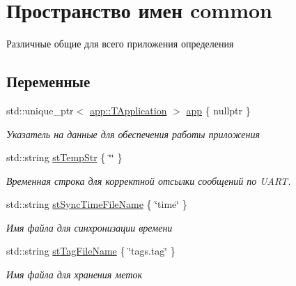 \hypertarget{namespacecommon}{}\section{Пространство имен common}
\label{namespacecommon}


Различные общие для всего приложения определения  


\subsection*{Переменные}
\begin{DoxyCompactItemize}
\item 
std\+::unique\+\_\+ptr$<$ \hyperlink{classapp_1_1_t_application}{app\+::\+T\+Application} $>$ \hyperlink{namespacecommon_afb09e0e369090296753bc8e2d0274823}{app} \{ nullptr \}
\begin{DoxyCompactList}\small\item\em Указатель на данные для обеспечения работы приложения \end{DoxyCompactList}\item 
\mbox{\label{namespacecommon_ac1517a41cc3b73ca63e645dca03d6d47}} 
std\+::string \hyperlink{namespacecommon_ac1517a41cc3b73ca63e645dca03d6d47}{st\+Temp\+Str} \{ \char`\"{}\char`\"{} \}
\begin{DoxyCompactList}\small\item\em Временная строка для корректной отсылки сообщений по U\+A\+RT. \end{DoxyCompactList}\item 
\mbox{\label{namespacecommon_a9e2c1d0b0f61994e2ebef34621b6ba0c}} 
std\+::string \hyperlink{namespacecommon_a9e2c1d0b0f61994e2ebef34621b6ba0c}{st\+Sync\+Time\+File\+Name} \{ \char`\"{}time\char`\"{} \}
\begin{DoxyCompactList}\small\item\em Имя файла для синхронизации времени \end{DoxyCompactList}\item 
\mbox{\label{namespacecommon_ac1f212cd0775ff1f6c0295b72d658e25}} 
std\+::string \hyperlink{namespacecommon_ac1f212cd0775ff1f6c0295b72d658e25}{st\+Tag\+File\+Name} \{ \char`\"{}tags.\+tag\char`\"{} \}
\begin{DoxyCompactList}\small\item\em Имя файла для хранения меток \end{DoxyCompactList}\item 

\end{DoxyCompactItemize}
